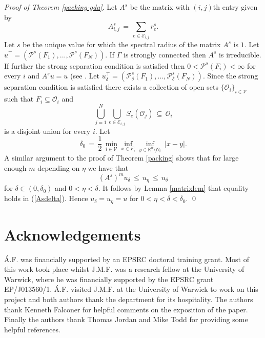 \documentclass[11pt,english,british]{article}
\numberwithin{equation}{section}
\renewcommand{\leq}{\leqslant}
\begin{document}
\emph{Proof of Theorem \ref{packing-gda}}.
Let $A^s$ be the matrix with $(i,j)$th entry given by
\[
A^s_{i,j} \, = \, \sum_{e \in \mathcal{E}_{i,j}}r^s_e.
\]
Let $s$ be the unique value for which the spectral radius of the matrix $A^s$ is $1$. Let $u^{\intercal}=(\mathcal{P}^s(F_1),...,\mathcal{P}^s(F_N))$. If $\Gamma$ is strongly connected then $A^s$ is irreducible. If further the strong separation condition is satisfied then $0<\mathcal{P}^s(F_i)<\infty$ for every $i$ and $A^s u=u$ (see \cite[Corollary 3.5]{techniques}. Let $u_{\delta}^{\intercal}=(\mathcal{P}_{\delta}^s(F_1),...,\mathcal{P}_{\delta}^s(F_N))$. Since the strong separation condition is satisfied there exists a collection of open sets $\{\mathcal{O}_{i}\}_{i  \in \mathcal{V}}$ such that $F_i\subseteq \mathcal{O}_i$ and
\[
  \bigcup_{j=1}^N \bigcup_{e \in \mathcal{E}_{i,j}} S_e(\mathcal{O}_j) \, \subseteq \, \mathcal{O}_i
\]
is a disjoint union for every $i$. Let
\[
\delta_0 \,  = \, \frac {1}{2} \, \min_{i\in \mathcal{V}}\inf_{x \in F_i} \inf_{y \in\mathbb{R}^n \setminus \mathcal{O}_i} \  \lvert x-y \rvert.
\]
A similar argument to the proof of Theorem \ref{packing} shows that for large enough $m$ depending on $\eta$ we have that
\begin{equation} \label{Asdelta}
(A^s)^m u_{\delta} \,  \leq \,   u_{\eta} \,  \leq \,  u_{\delta}
\end{equation}
for $\delta \in (0,\delta_0)$ and $0<\eta<\delta$.   It follows by Lemma \ref{matrixlem} that equality holds in (\ref{Asdelta}). Hence $ u_{\delta}=u_{\eta}=u$ for $0<\eta<\delta<\delta_0$.
\hfill \qed














\section*{Acknowledgements}

\'A.F. was financially supported by an EPSRC doctoral training grant.  Most of this work took place whilst J.M.F. was a research fellow at the University of Warwick, where he was financially supported by the EPSRC grant EP/J013560/1.  \'A.F. visited J.M.F. at the University of Warwick to work on this project and both authors thank the department for its hospitality.  The authors thank Kenneth Falconer for helpful comments on the exposition of the paper.  Finally the authors thank Thomas Jordan and Mike Todd for providing some helpful references.
\end{document}
